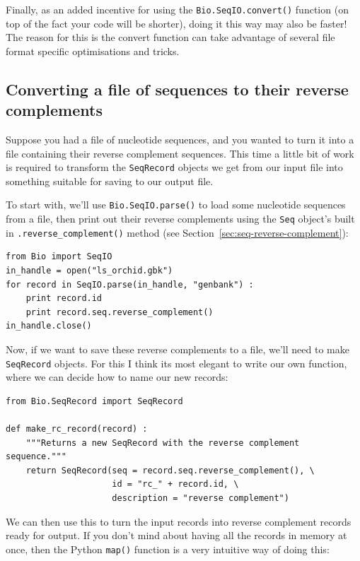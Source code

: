 \documentclass{report}
\begin{document}
Finally, as an added incentive for using the \verb|Bio.SeqIO.convert()| function
(on top of the fact your code will be shorter), doing it this way may also be
faster! The reason for this is the convert function can take advantage of
several file format specific optimisations and tricks.

\subsection{Converting a file of sequences to their reverse complements}
\label{sec:SeqIO-reverse-complement}
Suppose you had a file of nucleotide sequences, and you wanted to turn it into a file containing their reverse complement sequences.  This time a little bit of work is required to transform the \verb|SeqRecord| objects we get from our input file into something suitable for saving to our output file.

To start with, we'll use \verb|Bio.SeqIO.parse()| to load some nucleotide
sequences from a file, then print out their reverse complements using
the \verb|Seq| object's built in \verb|.reverse_complement()| method (see Section~\ref{sec:seq-reverse-complement}):

\begin{verbatim}
from Bio import SeqIO
in_handle = open("ls_orchid.gbk")
for record in SeqIO.parse(in_handle, "genbank") :
    print record.id
    print record.seq.reverse_complement()
in_handle.close()
\end{verbatim}

Now, if we want to save these reverse complements to a file, we'll need to make \verb|SeqRecord| objects.
For this I think its most elegant to write our own function, where we can decide how to name our
new records:

\begin{verbatim}
from Bio.SeqRecord import SeqRecord

def make_rc_record(record) :
    """Returns a new SeqRecord with the reverse complement sequence."""
    return SeqRecord(seq = record.seq.reverse_complement(), \
                     id = "rc_" + record.id, \
                     description = "reverse complement")
\end{verbatim}

We can then use this to turn the input records into reverse complement records ready for output.  If you don't mind about having all the records in memory at once, then the Python \verb|map()| function is a very intuitive way of doing this:
\end{document}
